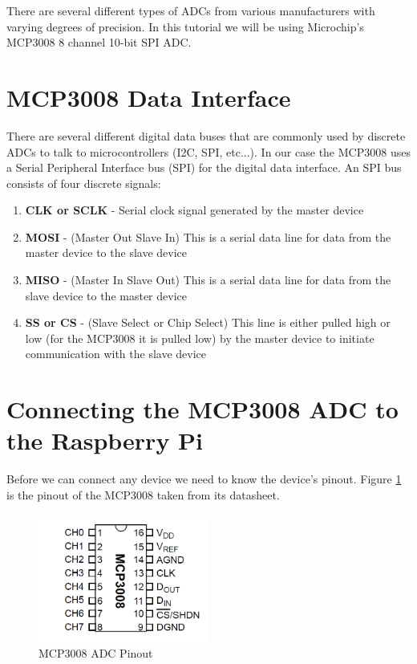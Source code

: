 \documentclass{article}
\begin{document}
There are several different types of ADCs from various manufacturers with varying degrees of precision. In this tutorial we will be using Microchip's MCP3008 8 channel 10-bit SPI ADC.



\section{MCP3008 Data Interface}

There are several different digital data buses that are commonly used by discrete ADCs to talk to microcontrollers (I2C, SPI, etc...). In our case the MCP3008 uses a Serial Peripheral Interface bus (SPI) for the digital data interface. An SPI bus consists of four discrete signals:

	\begin{enumerate}[1.)]
		
		\item \textbf{CLK or SCLK} - Serial clock signal generated by the master device
		
		\item \textbf{MOSI} - (Master Out Slave In) This is a serial data line for data from the master device to the slave device
		
		\item \textbf{MISO} - (Master In Slave Out) This is a serial data line for data from the slave device to the master device
		
		\item \textbf{SS or CS} - (Slave Select or Chip Select) This line is either pulled high or low (for the MCP3008 it is pulled low) by the master device to initiate communication with the slave device
		
	\end{enumerate}



\section{Connecting the MCP3008 ADC to the Raspberry Pi}

Before we can connect any device we need to know the device's pinout. Figure \ref{MCP3008_pinout} is the pinout of the MCP3008 taken from its datasheet.


	\begin{figure}[H]
		\centering
		\includegraphics[width=0.5\textwidth]{pics/MCP3008_pinout.png}
		\caption{MCP3008 ADC Pinout}
		\label{MCP3008_pinout}
	\end{figure}
\end{document}
